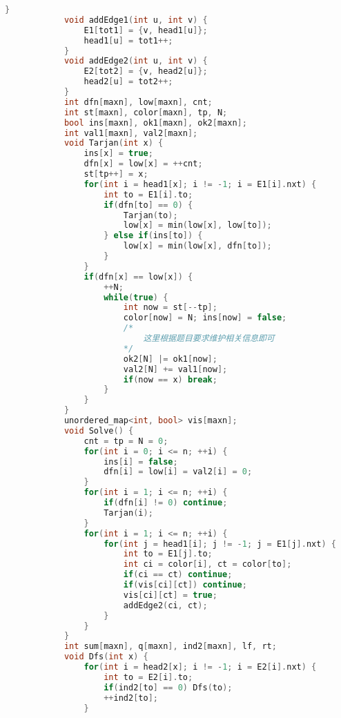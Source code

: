 \begin{lstlisting}[language=C++]
            }
            void addEdge1(int u, int v) {
                E1[tot1] = {v, head1[u]};
                head1[u] = tot1++;
            }
            void addEdge2(int u, int v) {
                E2[tot2] = {v, head2[u]};
                head2[u] = tot2++;
            }
            int dfn[maxn], low[maxn], cnt;
            int st[maxn], color[maxn], tp, N;
            bool ins[maxn], ok1[maxn], ok2[maxn];
            int val1[maxn], val2[maxn];
            void Tarjan(int x) {
                ins[x] = true;
                dfn[x] = low[x] = ++cnt;
                st[tp++] = x;
                for(int i = head1[x]; i != -1; i = E1[i].nxt) {
                    int to = E1[i].to;
                    if(dfn[to] == 0) {
                        Tarjan(to);
                        low[x] = min(low[x], low[to]);
                    } else if(ins[to]) {
                        low[x] = min(low[x], dfn[to]);
                    }
                }
                if(dfn[x] == low[x]) {
                    ++N;
                    while(true) {
                        int now = st[--tp];
                        color[now] = N; ins[now] = false;
                        /*
                            这里根据题目要求维护相关信息即可
                        */
                        ok2[N] |= ok1[now];
                        val2[N] += val1[now];
                        if(now == x) break;
                    }
                }
            }
            unordered_map<int, bool> vis[maxn];
            void Solve() {
                cnt = tp = N = 0;
                for(int i = 0; i <= n; ++i) {
                    ins[i] = false;
                    dfn[i] = low[i] = val2[i] = 0;
                }
                for(int i = 1; i <= n; ++i) {
                    if(dfn[i] != 0) continue;
                    Tarjan(i);
                }
                for(int i = 1; i <= n; ++i) {
                    for(int j = head1[i]; j != -1; j = E1[j].nxt) {
                        int to = E1[j].to;
                        int ci = color[i], ct = color[to];
                        if(ci == ct) continue;
                        if(vis[ci][ct]) continue;
                        vis[ci][ct] = true;
                        addEdge2(ci, ct);
                    }
                }
            }
            int sum[maxn], q[maxn], ind2[maxn], lf, rt;
            void Dfs(int x) {
                for(int i = head2[x]; i != -1; i = E2[i].nxt) {
                    int to = E2[i].to;
                    if(ind2[to] == 0) Dfs(to);
                    ++ind2[to];
                }

\end{lstlisting}
